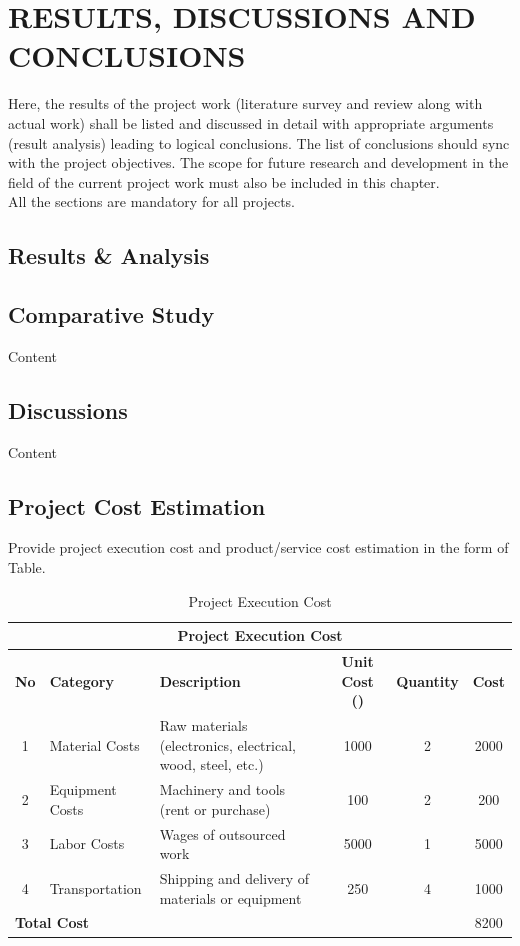 \chapter{RESULTS, DISCUSSIONS AND CONCLUSIONS} %
\label{ChapterResults} %

Here, the results of the project work (literature survey and review along with actual work) shall be listed and discussed in detail with appropriate arguments (result analysis) leading to logical conclusions. The list of conclusions should sync with the project objectives. The scope for future research and development in the field of the current project work must also be included in this chapter.  \\

All the sections are mandatory for all projects. 

\section{Results \& Analysis}


\section{Comparative Study}
Content

\section{Discussions}
Content


\section{Project Cost Estimation}
Provide project execution cost and  product/service cost estimation in the form of Table.

\begin{table}[h]
	\centering
	\caption{Project Execution Cost}
	\begin{tabular}{|c|p{2.5cm}|p{4.5cm}|c|c|c|}
		\hline
		\multicolumn{6}{|c|}{\textbf{Project Execution Cost}} \\
		\hline
		\textbf{No}  & \textbf{Category} &  \textbf{Description} & \textbf{Unit  Cost (\rupee )} & \textbf{Quantity} & \textbf{Cost}\\
		\hline
		1  & Material Costs &  Raw materials (electronics, electrical, wood, steel, etc.) & 1000 & 2 & 2000\\
		2  & Equipment Costs &  Machinery and tools (rent or purchase) & 100 & 2 & 200\\
		3  & Labor Costs &  Wages of outsourced work & 5000 & 1 & 5000\\
		4  & Transportation &  Shipping and delivery of materials or equipment & 250 & 4 & 1000\\
		\hline
		\multicolumn{5}{|l|}{\textbf{Total Cost}} & 8200\\
		\hline
	\end{tabular}%
	\label{tab:executioncost}%
\end{table}%


